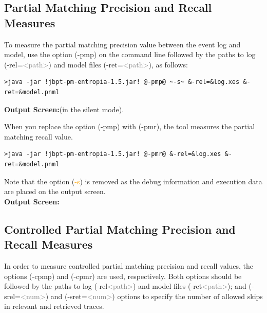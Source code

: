 \documentclass{article}
\begin{document}
\subsection{Partial Matching Precision and Recall Measures}
To measure the partial matching precision value between the event log and model, use the option (\textcolor{darkcandyapplered}{\footnotesize\ttfamily-pmp}) on the command line followed by the paths to log (\textcolor{ao}{\footnotesize\ttfamily-rel=}\textcolor{gray}{\footnotesize\ttfamily<path>}) and model files (\textcolor{ao}{\footnotesize\ttfamily-ret=}\textcolor{gray}{\footnotesize\ttfamily<path>}), as follows: 
\begin{lstlisting}[style=CL]
>java -jar !jbpt-pm-entropia-1.5.jar! @-pmp@ ~-s~ &-rel=&log.xes &-ret=&model.pnml
\end{lstlisting}
\textbf{Output Screen:}(in the silent mode).

When you replace the option (\textcolor{darkcandyapplered}{\footnotesize\ttfamily-pmp}) with (\textcolor{darkcandyapplered}{\footnotesize\ttfamily-pmr}), the tool measures the partial matching recall value.
\begin{lstlisting}[style=CL]
>java -jar !jbpt-pm-entropia-1.5.jar! @-pmr@ &-rel=&log.xes &-ret=&model.pnml
\end{lstlisting}
Note that the option (\textcolor{orange}{\footnotesize\ttfamily-s}) is removed as the debug information and execution data are placed on the output screen. \\
\textbf{Output Screen:}


\subsection{Controlled Partial Matching Precision and Recall Measures}
In order to measure controlled partial matching precision and recall values, the options (\textcolor{darkcandyapplered}{\footnotesize\ttfamily-cpmp}) and (\textcolor{darkcandyapplered}{\footnotesize\ttfamily-cpmr}) are used, respectively. Both options should be followed by the paths to log (\textcolor{ao}{\footnotesize\ttfamily-rel}\textcolor{gray}{\footnotesize\ttfamily<path>}) and model files (\textcolor{ao}{\footnotesize\ttfamily-ret}\textcolor{gray}{\footnotesize\ttfamily<path>}); and (\textcolor{ao}{\footnotesize\ttfamily-srel=}\textcolor{gray}{\footnotesize\ttfamily<num>}) and (\textcolor{ao}{\footnotesize\ttfamily-sret=}\textcolor{gray}{\footnotesize\ttfamily<num>}) options to specify the number of allowed skips in relevant and retrieved traces. 
\end{document}
